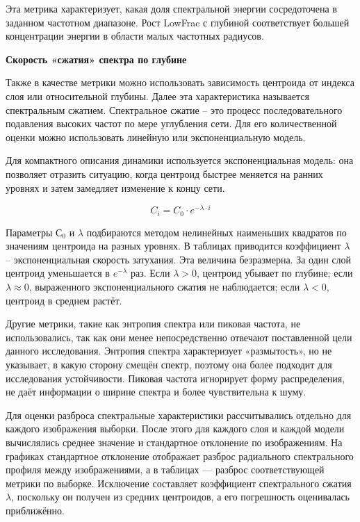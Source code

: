 Эта метрика характеризует, какая доля спектральной энергии сосредоточена в заданном частотном диапазоне. Рост LowFrac с глубиной соответствует большей концентрации энергии в области малых частотных радиусов. 

\textbf{Скорость «сжатия» спектра по глубине}

Также в качестве метрики можно использовать зависимость центроида от индекса слоя или относительной глубины. Далее эта характеристика называется спектральным сжатием. Спектральное сжатие – это процесс последовательного подавления высоких частот по мере углубления сети. Для его количественной оценки можно использовать линейную или экспоненциальную модель. 

Для компактного описания динамики используется экспоненциальная модель: она позволяет отразить ситуацию, когда центроид быстрее меняется на ранних уровнях и затем замедляет изменение к концу сети.

\begin{equation}
    C_{i}=C_{0} \cdot e^{-\lambda \cdot i} \label{eq:slope}
\end{equation}

Параметры $С_0$ и $\lambda$ подбираются методом нелинейных наименьших квадратов по значениям центроида на разных уровнях. В таблицах приводится коэффициент $\lambda$ – экспоненциальная скорость затухания. Эта величина безразмерна. За один слой центроид уменьшается в $e^{-\lambda} $ раз. Если $\lambda>0$, центроид убывает по глубине; если $\lambda \approx 0$, выраженного экспоненциального сжатия не наблюдается; если $\lambda<0$, центроид в среднем растёт.

Другие метрики, такие как энтропия спектра или пиковая частота, не использовались, так как они менее непосредственно отвечают поставленной цели данного исследования. Энтропия спектра характеризует «размытость», но не указывает, в какую сторону смещён спектр, поэтому она более подходит для исследования устойчивости. Пиковая частота игнорирует форму распределения, не даёт информации о ширине спектра и более чувствительна к шуму.

Для оценки разброса спектральные характеристики рассчитывались отдельно для каждого изображения выборки. После этого для каждого слоя и каждой модели вычислялись среднее значение и стандартное отклонение по изображениям. На графиках стандартное отклонение отображает разброс радиального спектрального профиля между изображениями, а в таблицах — разброс соответствующей метрики по выборке. Исключение составляет коэффициент спектрального сжатия $\lambda$, поскольку он получен из средних центроидов, а его погрешность оценивалась приближённо.

